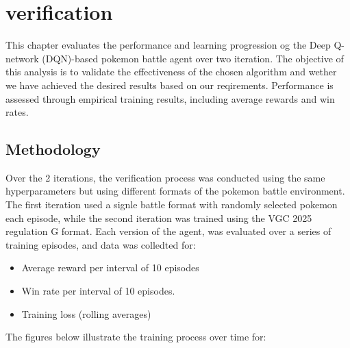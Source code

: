 \section{verification}
\label{sec:verification}

This chapter evaluates the performance and learning progression og the Deep Q-network 
(DQN)-based pokemon battle agent over two iteration. The objective of this analysis 
is to validate the effectiveness of the chosen algorithm and wether we have achieved
the desired results based on our reqirements. Performance is assessed through empirical
training results, including average rewards and win rates.  

\subsection{Methodology}
Over the 2 iterations, the verification process was conducted using the same hyperparameters
but using different formats of the pokemon battle environment.
The first iteration used a signle battle format with randomly selected pokemon each
episode, while the second iteration was trained using the VGC 2025 regulation G format.
Each version of the agent, was evaluated over a series of training episodes, and data 
was colledted for:
\begin{itemize}
    \item Average reward per interval of 10 episodes
    \item Win rate per interval of 10 episodes.
    \item Training loss (rolling averages)
\end{itemize}
The figures below illustrate the training process over time for:
